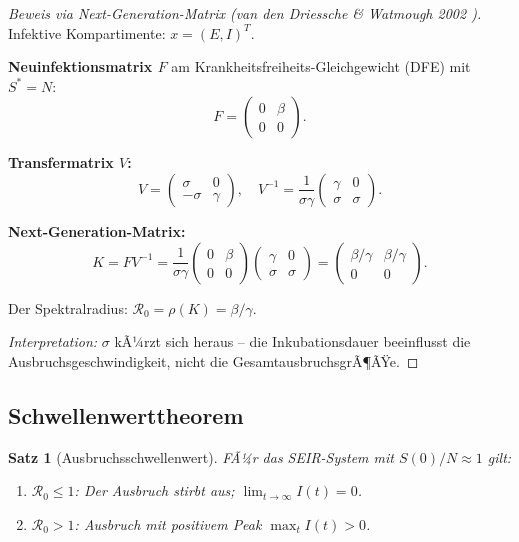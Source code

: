 ﻿\documentclass[12pt,a4paper]{article}
\theoremstyle{definition}
\theoremstyle{plain}
\newtheorem{satz}[definition]{Satz}
\theoremstyle{remark}
\begin{document}
\begin{proof}[Beweis via Next-Generation-Matrix (van den Driessche \& Watmough 2002 \cite{driessche2002})]
Infektive Kompartimente: $x = (E, I)^T$.

\textbf{Neuinfektionsmatrix $F$} am Krankheitsfreiheits-Gleichgewicht (DFE) mit $S^* = N$:
\[
  F = \begin{pmatrix} 0 & \beta \\ 0 & 0 \end{pmatrix}.
\]

\textbf{Transfermatrix $V$:}
\[
  V = \begin{pmatrix} \sigma & 0 \\ -\sigma & \gamma \end{pmatrix}, \quad
  V^{-1} = \frac{1}{\sigma \gamma}
    \begin{pmatrix} \gamma & 0 \\ \sigma & \sigma \end{pmatrix}.
\]

\textbf{Next-Generation-Matrix:}
\[
  K = FV^{-1}
    = \frac{1}{\sigma\gamma}\begin{pmatrix} 0 & \beta \\ 0 & 0 \end{pmatrix}
      \begin{pmatrix} \gamma & 0 \\ \sigma & \sigma \end{pmatrix}
    = \begin{pmatrix} \beta/\gamma & \beta/\gamma \\ 0 & 0 \end{pmatrix}.
\]

Der Spektralradius: $\mathcal{R}_0 = \rho(K) = \beta/\gamma$.

\textit{Interpretation:} $\sigma$ kÃ¼rzt sich heraus -- die Inkubationsdauer beeinflusst
die Ausbruchsgeschwindigkeit, nicht die GesamtausbruchsgrÃ¶ÃŸe.
\end{proof}

\subsection{Schwellenwerttheorem}

\begin{satz}[Ausbruchsschwellenwert]
\label{satz:schwelle}
FÃ¼r das SEIR-System mit $S(0)/N \approx 1$ gilt:
\begin{enumerate}
  \item $\mathcal{R}_0 \leq 1$: Der Ausbruch stirbt aus; $\lim_{t\to\infty} I(t) = 0$.
  \item $\mathcal{R}_0 > 1$: Ausbruch mit positivem Peak $\max_t I(t) > 0$.
\end{enumerate}
\end{satz}
\end{document}
